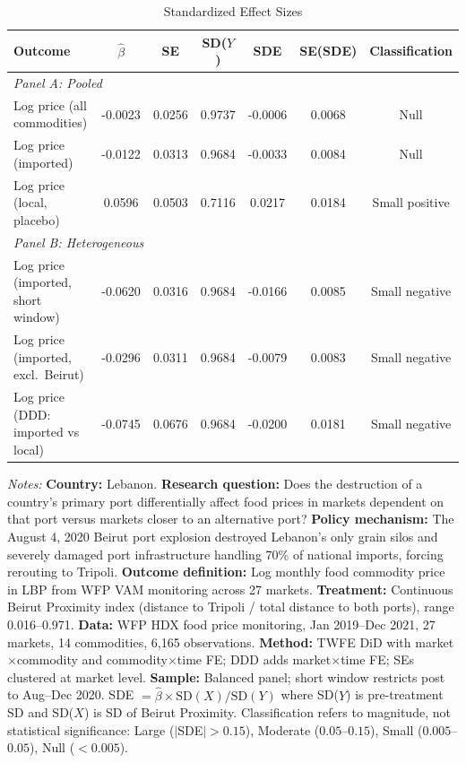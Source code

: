 \begin{table}[htbp]
\centering
\caption{Standardized Effect Sizes}
\label{tab:sde}
\scriptsize
\begin{threeparttable}
\begin{tabular}{p{3.5cm}cccccc}
\toprule
Outcome & $\hat{\beta}$ & SE & SD($Y$) & SDE & SE(SDE) & Classification \\
\midrule
\multicolumn{7}{l}{\textit{Panel A: Pooled}} \\
Log price (all commodities) & -0.0023 & 0.0256 & 0.9737 & -0.0006 & 0.0068 & Null \\
Log price (imported) & -0.0122 & 0.0313 & 0.9684 & -0.0033 & 0.0084 & Null \\
Log price (local, placebo) & 0.0596 & 0.0503 & 0.7116 & 0.0217 & 0.0184 & Small positive \\
\midrule
\multicolumn{7}{l}{\textit{Panel B: Heterogeneous}} \\
Log price (imported, short window) & -0.0620 & 0.0316 & 0.9684 & -0.0166 & 0.0085 & Small negative \\
Log price (imported, excl.\ Beirut) & -0.0296 & 0.0311 & 0.9684 & -0.0079 & 0.0083 & Small negative \\
Log price (DDD: imported vs local) & -0.0745 & 0.0676 & 0.9684 & -0.0200 & 0.0181 & Small negative \\
\bottomrule
\end{tabular}
\begin{tablenotes}[flushleft]
\tiny
\item \textit{Notes:} \textbf{Country:} Lebanon. \textbf{Research question:} Does the destruction of a country's primary port differentially affect food prices in markets dependent on that port versus markets closer to an alternative port? \textbf{Policy mechanism:} The August 4, 2020 Beirut port explosion destroyed Lebanon's only grain silos and severely damaged port infrastructure handling 70\% of national imports, forcing rerouting to Tripoli. \textbf{Outcome definition:} Log monthly food commodity price in LBP from WFP VAM monitoring across 27 markets. \textbf{Treatment:} Continuous Beirut Proximity index (distance to Tripoli / total distance to both ports), range 0.016--0.971. \textbf{Data:} WFP HDX food price monitoring, Jan 2019--Dec 2021, 27 markets, 14 commodities, 6,165 observations. \textbf{Method:} TWFE DiD with market$\times$commodity and commodity$\times$time FE; DDD adds market$\times$time FE; SEs clustered at market level. \textbf{Sample:} Balanced panel; short window restricts post to Aug--Dec 2020. SDE $= \hat{\beta} \times \text{SD}(X) / \text{SD}(Y)$ where SD($Y$) is pre-treatment SD and SD($X$) is SD of Beirut Proximity. Classification refers to magnitude, not statistical significance: Large ($|$SDE$| > 0.15$), Moderate ($0.05$--$0.15$), Small ($0.005$--$0.05$), Null ($< 0.005$).
\end{tablenotes}
\end{threeparttable}
\end{table}
